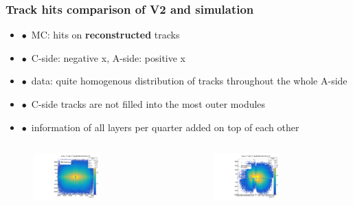 \documentclass[aspectratio=1610, 12pt]{beamer}
\begin{document}
\begin{frame}\frametitle{Track hits comparison of V2 and simulation}
  \begin{itemize}
    \item $\bullet$\, MC: hits on \textbf{reconstructed} tracks
    \item $\bullet$\, C-side: negative x, A-side: positive x
    \item $\bullet$\, data: quite homogenous distribution of tracks throughout the whole A-side
    \item $\bullet$\, C-side tracks are not filled into the most outer modules
    \item $\bullet$\, information of all layers per quarter added on top of each other
  \end{itemize}
  \begin{columns}
    \begin{column}[c]{0.48\textwidth}
      \begin{figure}
        \centering
        \includegraphics[width=0.6\textwidth]{logos/nodeXY_MC.pdf}%
      \end{figure}
    \end{column}
    \begin{column}[c]{0.48\textwidth}
      \begin{figure}
        \centering
        \includegraphics[width=0.6\textwidth]{tuples_out/combining_2D_nodeXY_v2.pdf}%
      \end{figure}
    \end{column}
  \end{columns}
\end{frame}
\end{document}
